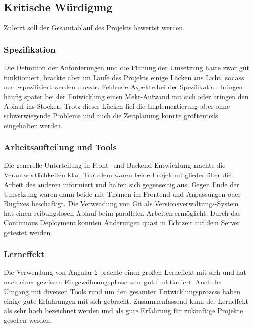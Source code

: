 \subsection{Kritische Würdigung}
Zuletzt soll der Gesamtablauf des Projekts bewertet werden.
\subsubsection{Spezifikation}
Die Definition der Anforderungen und die Planung der Umsetzung hatte zwar gut funktioniert, brachte aber im Laufe des Projekts einige Lücken ans Licht, sodass nach-spezifiziert werden musste.
Fehlende Aspekte bei der Spezifikation bringen häufig später bei der Entwicklung einen Mehr-Aufwand mit sich oder bringen den Ablauf ins Stocken.
Trotz dieser Lücken lief die Implementierung aber ohne schwerwiegende Probleme und auch die Zeitplanung konnte größtenteils eingehalten werden.
\subsubsection{Arbeitsaufteilung und Tools}
Die generelle Unterteilung in Front- und Backend-Entwicklung machte die Verantwortlichkeiten klar. Trotzdem waren beide Projektmitglieder über die Arbeit des anderen informiert und halfen sich gegenseitig aus.
Gegen Ende der Umsetzung waren dann beide mit Themen im Frontend und Anpassungen oder Bugfixes beschäftigt.
Die Verwendung von Git als Versionsverwaltungs-System hat einen reibungslosen Ablauf beim parallelen Arbeiten ermöglicht.
Durch das Continuous Deployment konnten Änderungen quasi in Echtzeit auf dem Server getestet werden.
\subsubsection{Lerneffekt}
Die Verwendung von Angular 2 brachte einen großen Lerneffekt mit sich und hat nach einer gewissen Eingewöhnungsphase sehr gut funktioniert.
Auch der Umgang mit diversen Tools rund um den gesamten Entwicklungsprozess haben einige gute Erfahrungen mit sich gebracht.
Zusammenfassend kann der Lerneffekt als sehr hoch bezeichnet werden und als gute Erfahrung für zukünftige Projekte gesehen werden.
